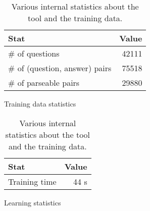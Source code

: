 \begin{table}
    \begin{subfigure}[b]{0.48\textwidth}
        \begin{center}
        \begin{tabular}[t]{lr}
            \textbf{Stat} & \textbf{Value} \\
            \hline
            \# of questions                & 42111 \\
            \# of (question, answer) pairs & 75518 \\
            \# of parseable pairs          & 29880 \\
        \end{tabular}
        \end{center}
        \caption{Training data statistics}
    \end{subfigure}
    \begin{subfigure}[b]{0.48\textwidth}
        \begin{center}
        \begin{tabular}[t]{lr}
            \textbf{Stat} & \textbf{Value} \\
            \hline
            Training time & 44 s \\
        \end{tabular}
        \end{center}
        \caption{Learning statistics}
    \end{subfigure}
    \caption{Various internal statistics about the tool and the training data.}
    \label{tbl:stats}
\end{table}



